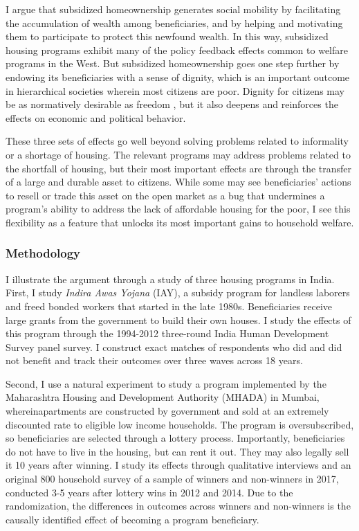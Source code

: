 \documentclass[12pt]{article}
\begin{document}
I argue that subsidized homeownership generates social mobility by facilitating the accumulation of wealth among beneficiaries, and by helping and motivating them to participate to protect this newfound wealth. In this way, subsidized housing programs exhibit many of the policy feedback effects common to welfare programs in the West. But subsidized homeownership goes one step further by endowing its beneficiaries with a sense of dignity, which is an important outcome in hierarchical societies wherein most citizens are poor. Dignity for citizens may be as normatively desirable as freedom \citep{sen1999development}, but it also deepens and reinforces the effects on economic and political behavior.
 
  These three sets of effects go well beyond solving problems related to informality or a shortage of housing. The relevant programs may address problems related to the shortfall of housing, but their most important effects are through the transfer of a large and durable asset to citizens. While some may see beneficiaries' actions to resell or trade this asset on the open market as a bug that undermines a program's ability to address the lack of affordable housing for the poor, I see this flexibility as a feature that unlocks its most important gains to household welfare. 
  
  \subsubsection*{Methodology}

I illustrate the argument through a study of three housing programs in India. First, I study \textit{Indira Awas Yojana} (IAY), a  subsidy program for landless laborers and freed bonded workers that started in the late 1980s. Beneficiaries receive large grants from the government to build their own houses. I study the effects of this program through the 1994-2012 three-round India Human Development Survey \citep{desai_national_2016} panel survey. I construct exact matches of respondents who did and did not benefit and track their outcomes over three waves across 18 years. 



Second, I use a natural experiment to study a program implemented by the Maharashtra Housing and Development Authority (MHADA) in Mumbai, whereinapartments are constructed by government and sold at an extremely discounted rate to eligible low income households. The program is oversubscribed, so beneficiaries are selected through a lottery process. Importantly, beneficiaries do not have to live in the housing, but can rent it out. They may also legally sell it 10 years after winning.  I study its effects through qualitative interviews and an original 800 household survey of a sample of winners and non-winners  in 2017, conducted 3-5 years after lottery wins in 2012 and 2014. Due to the randomization, the differences in outcomes across winners and non-winners is the causally identified effect of becoming a program beneficiary.
\end{document}
